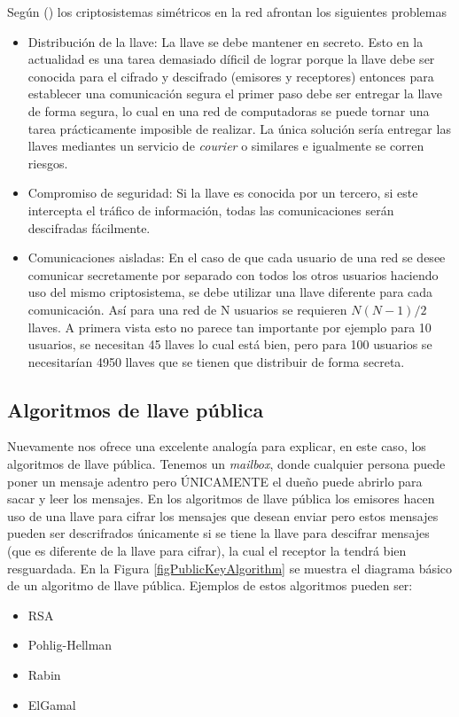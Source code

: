 Según (\cite{bruce}) los criptosistemas simétricos en la red afrontan los siguientes problemas
\begin{itemize}
\item Distribución de la llave: La llave se debe mantener en secreto. Esto en la actualidad es una tarea demasiado díficil de lograr porque la llave debe ser conocida para el cifrado y descifrado (emisores y receptores) entonces para establecer una comunicación segura el primer paso debe ser entregar la llave de forma segura, lo cual en una red de computadoras se puede tornar una tarea prácticamente imposible de realizar. La única solución sería entregar las llaves mediantes un servicio de \textit{courier} o similares e igualmente se corren riesgos. 

\item Compromiso de seguridad: Si la llave es conocida por un tercero, si este intercepta el tráfico de información, todas las comunicaciones serán descifradas fácilmente.

\item Comunicaciones aisladas: En el caso de que cada usuario de una red se desee comunicar secretamente por separado con todos los otros usuarios haciendo uso del mismo criptosistema, se debe utilizar una llave diferente para cada comunicación. Así para una red de N usuarios se requieren $N(N - 1)/2$ llaves. A primera vista esto no parece tan importante por ejemplo para 10 usuarios, se necesitan 45 llaves lo cual está bien, pero para 100 usuarios se necesitarían 4950 llaves que se tienen que distribuir de forma secreta.
\end{itemize}



\subsection{Algoritmos de llave pública}
Nuevamente \cite{bruce} nos ofrece una excelente analogía para explicar, en este caso, los algoritmos de llave pública. Tenemos un \textit{mailbox}, donde cualquier persona puede poner un mensaje adentro pero ÚNICAMENTE el dueño puede abrirlo para sacar y leer los mensajes.
\newline
\newline
En los algoritmos de llave pública los emisores hacen uso de una llave para cifrar los mensajes que desean enviar pero estos mensajes pueden ser descrifrados únicamente si se tiene la llave para descifrar mensajes (que es diferente de la llave para cifrar), la cual el receptor la tendrá bien resguardada. En la Figura \ref{figPublicKeyAlgorithm} se muestra el diagrama básico de un algoritmo de llave pública. Ejemplos de estos algoritmos pueden ser:
\begin{itemize}
\item RSA
\item Pohlig-Hellman
\item Rabin
\item ElGamal
\end{itemize}

